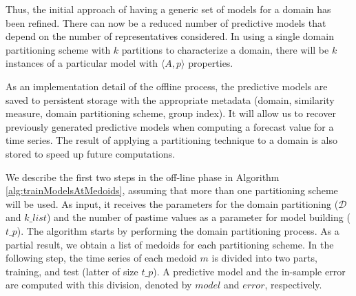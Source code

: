 Thus, the initial approach of having a generic set of models for a domain has been refined. There can now be a reduced number of predictive models that depend on the number of representatives considered. In using a single domain partitioning scheme with $k$ partitions to characterize a domain, there will be $k$ instances of a particular model with $\langle A, p \rangle$ properties. 

As an implementation detail of the offline process, the predictive models are saved to persistent storage with the appropriate metadata (domain, similarity measure, domain partitioning scheme, group index). It will allow us to recover previously generated predictive models when computing a forecast value for a time series. The result of applying a partitioning technique to a domain is also stored to speed up future computations.

We describe the first two steps in the off-line phase in Algorithm \ref{alg:trainModelsAtMedoids}, assuming that more than one partitioning scheme will be used. As input, it receives the parameters for the domain partitioning ($\mathcal{D}$ and $k\_list$) and the number of pastime values as a parameter for model building ($t\_p$). The algorithm starts by performing the domain partitioning process. As a partial result, we obtain a list of medoids for each partitioning scheme. In the following step, the time series of each medoid $m$ is divided into two parts, training, and test (latter of size $t\_p$). A predictive model and the in-sample error are computed with this division, denoted by $model$ and $error$, respectively.

